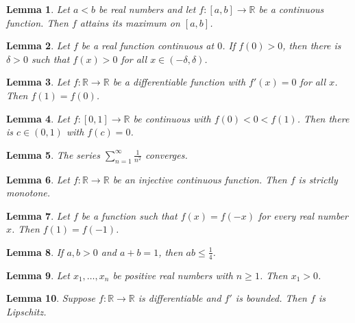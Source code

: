 \documentclass{article}
\newtheorem{lemma}{Lemma}
\begin{document}
\begin{lemma}\label{extreme-value}
Let $a<b$ be real numbers and let $f\colon[a,b]\to\mathbb{R}$ be a continuous function. Then $f$ attains its maximum on $[a,b]$.
\end{lemma}

\begin{lemma}\label{continuous-at}
Let $f$ be a real function continuous at $0$. If $f(0)>0$, then there is $\delta>0$ such that $f(x)>0$ for all $x\in(-\delta,\delta)$.
\end{lemma}

\begin{lemma}\label{zero-derivative}
Let $f\colon\mathbb{R}\to\mathbb{R}$ be a differentiable function with $f'(x)=0$ for all $x$. Then $f(1)=f(0)$.
\end{lemma}

\begin{lemma}\label{intermediate-value}
Let $f\colon[0,1]\to\mathbb{R}$ be continuous with $f(0)<0<f(1)$. Then there is $c\in(0,1)$ with $f(c)=0$.
\end{lemma}

\begin{lemma}\label{basel-converges}
The series $\sum_{n=1}^\infty\frac{1}{n^2}$ converges.
\end{lemma}

\begin{lemma}\label{injective-monotone}
Let $f\colon\mathbb{R}\to\mathbb{R}$ be an injective continuous function. Then $f$ is strictly monotone.
\end{lemma}

\begin{lemma}\label{even-function}
Let $f$ be a function such that $f(x)=f(-x)$ for every real number $x$. Then $f(1)=f(-1)$.
\end{lemma}

\begin{lemma}\label{common-bound}
If $a,b>0$ and $a+b=1$, then $ab\le\frac14$.
\end{lemma}

\begin{lemma}\label{implicit-length}
Let $x_1,\ldots,x_n$ be positive real numbers with $n\ge1$. Then $x_1>0$.
\end{lemma}

\begin{lemma}\label{suppose-map}
Suppose $f\colon\mathbb{R}\to\mathbb{R}$ is differentiable and $f'$ is bounded. Then $f$ is Lipschitz.
\end{lemma}
\end{document}

